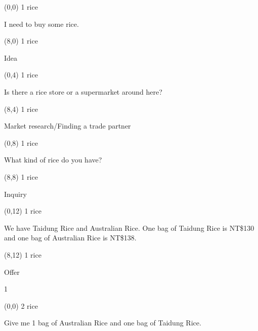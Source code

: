 \documentclass[a4paper]{article}
\newcommand{\mycard}[5]{%
	\small #1 #2
	\par
	\centering
	\parbox[t][6.8cm][c]{8.5cm}{%
	\Large#3\\
	\normalsize#4 #5
	}
}
\begin{document}
\selectfont

\begin{textblock}{8}(0,0)
\mycard{1}{rice}{I need to buy some rice.}{}{} 
\end{textblock}

\begin{textblock}{8}(8,0)
\mycard{1}{rice}{Idea}{}{} 
\end{textblock}

\begin{textblock}{8}(0,4)
\mycard{1}{rice}{Is there a rice store or a supermarket around here?}{}{} 
\end{textblock}

\begin{textblock}{8}(8,4)
\mycard{1}{rice}{Market research/Finding a trade partner}{}{} 
\end{textblock}

\begin{textblock}{8}(0,8)
\mycard{1}{rice}{What kind of rice do you have?}{}{} 
\end{textblock}

\begin{textblock}{8}(8,8)
\mycard{1}{rice}{Inquiry}{}{} 
\end{textblock}

\begin{textblock}{8}(0,12)
\mycard{1}{rice}{We have Taidung Rice and Australian Rice. One bag of Taidung Rice  is NT\$130 and one bag of Australian Rice is NT\$138.}{}{} 
\end{textblock}

\begin{textblock}{8}(8,12)
\mycard{1}{rice}{Offer}{}{} 
\end{textblock}

1\\
\newpage

\begin{textblock}{8}(0,0)
\mycard{2}{rice}{Give me 1 bag of Australian Rice and one bag of Taidung Rice.}{}{} 
\end{textblock}
\end{document}
